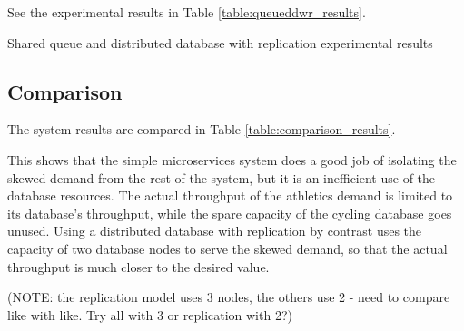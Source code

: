 See the experimental results in Table \ref{table:queueddwr_results}.

\begin{table}[h!]
	\begin{center}
		\caption{Shared queue and distributed database with replication experimental results}
		\label{table:queueddwr_results}
	\end{center}
\end{table}

%
%
\subsection{Comparison}

\begin{shaded}
The system results are compared in Table \ref{table:comparison_results}.

This shows that the simple microservices system does a good job of isolating the skewed demand from the rest of the system, but it is an inefficient use of the database resources.  The actual throughput of the athletics demand is limited to its database's throughput, while the spare capacity of the cycling database goes unused.  Using a distributed database with replication by contrast uses the capacity of two database nodes to serve the skewed demand, so that the actual throughput is much closer to the desired value.

(NOTE: the replication model uses 3 nodes, the others use 2 - need to compare like with like.  Try all with 3 or replication with 2?)
\end{shaded}

